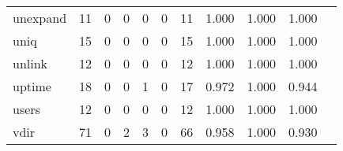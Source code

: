 \begin{longtable}{lp{1.2cm}p{1.2cm}p{1.2cm}p{1.2cm}p{1.2cm}p{1.2cm}p{1.2cm}p{1.2cm}p{1.2cm}p{1.2cm}}
unexpand  &                                    11 &                                                  0 &                                                  0 &                                                  0 &                                                  0 &                                                 11 &                                              1.000 &                                              1.000 &                                              1.000 \\
uniq      &                                    15 &                                                  0 &                                                  0 &                                                  0 &                                                  0 &                                                 15 &                                              1.000 &                                              1.000 &                                              1.000 \\
unlink    &                                    12 &                                                  0 &                                                  0 &                                                  0 &                                                  0 &                                                 12 &                                              1.000 &                                              1.000 &                                              1.000 \\
uptime    &                                    18 &                                                  0 &                                                  0 &                                                  1 &                                                  0 &                                                 17 &                                              0.972 &                                              1.000 &                                              0.944 \\
users     &                                    12 &                                                  0 &                                                  0 &                                                  0 &                                                  0 &                                                 12 &                                              1.000 &                                              1.000 &                                              1.000 \\
vdir      &                                    71 &                                                  0 &                                                  2 &                                                  3 &                                                  0 &                                                 66 &                                              0.958 &                                              1.000 &                                              0.930 \\

\end{longtable}
